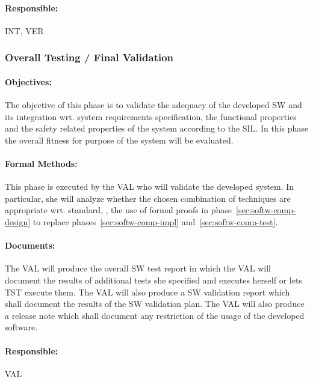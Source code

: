 \paragraph{Responsible:}
\label{sec:sw-int-responsible}
INT, VER

\subsubsection{Overall Testing / Final Validation}
\label{sec:overall-testing-}

\paragraph{Objectives:}
\label{sec:sw-test-objectives}
The objective of this phase is to validate the adequacy of the developed SW and
its integration wrt. system requirements specification, the functional
properties and the safety related properties of the system according to the
SIL. In this phase the overall fitness for purpose of the system will be
evaluated.

\paragraph{Formal Methods:}
\label{sec:sw-test-formal-methods}
This phase is executed by the VAL who will validate the developed system. In
particular, she will analyze whether the chosen combination of techniques are
appropriate wrt. standard, \eg, the use of formal proofs in
phase~\ref{sec:softw-comp-design} to replace phases~\ref{sec:softw-comp-impl}
and~\ref{sec:softw-comp-test}.

\paragraph{Documents:}
\label{sec:sw-test-documents}
The VAL will produce the overall SW test report in which the VAL will document
the results of additional tests she specified and executes herself or lets TST
execute them. The VAL will also produce a SW validation report which shall
document the results of the SW validation plan. The VAL will also produce a
release note which shall document any restriction of the usage of the developed
software.

\paragraph{Responsible:}
\label{sec:sw-test-responsible}
VAL


